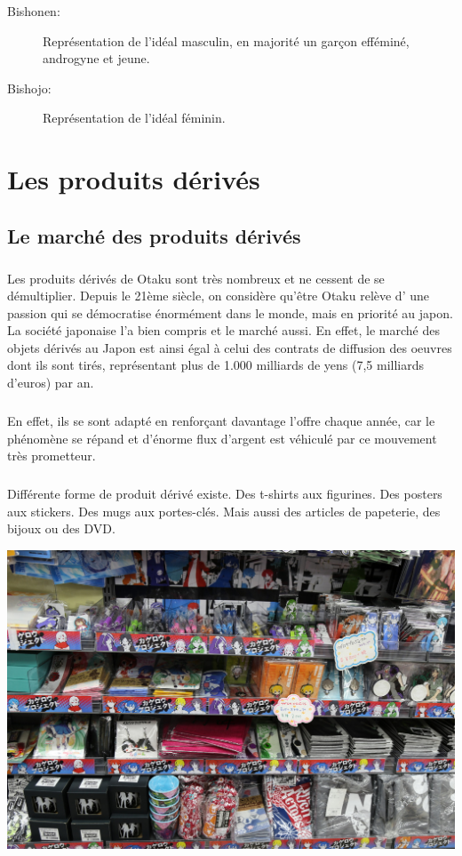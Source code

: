 \begin{description}
	\item[Bishonen:] Représentation de l'idéal masculin, en majorité un garçon
		efféminé, androgyne et jeune.
	\item[Bishojo:] Représentation de l'idéal féminin.
\end{description}

\chapter{Les produits dérivés}
\section{Le marché des produits dérivés}
\paragraph{}
Les produits dérivés de Otaku sont très nombreux et ne cessent de se démultiplier. Depuis le 21ème siècle, on considère qu’être Otaku relève d’ une passion qui se démocratise énormément dans le monde, mais en priorité au japon. La société japonaise l’a bien compris et le marché aussi. En effet, le marché des objets dérivés au Japon est ainsi égal à celui des contrats de diffusion des oeuvres dont ils sont tirés, représentant plus de 1.000 milliards de yens (7,5 milliards d'euros) par an. 
\paragraph{}
En effet, ils se sont adapté en renforçant davantage l'offre chaque année, car le phénomène se répand et d'énorme flux d'argent est véhiculé par ce mouvement très prometteur.
\paragraph{}
Différente forme de produit dérivé existe. Des t-shirts aux figurines. Des posters aux stickers. Des mugs aux portes-clés. Mais aussi des articles de papeterie, des bijoux ou des DVD. 
\begin{center}
	\includegraphics[scale=0.15]{produit.jpg}
\end{center}

